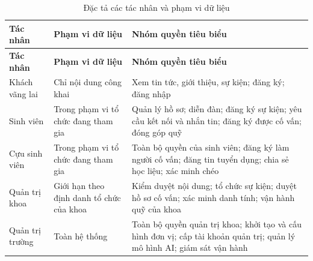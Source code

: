 \documentclass[12pt,a4paper,oneside]{report}
\begin{document}
\renewcommand{\arraystretch}{1.2}
\begin{longtable}{|>{\raggedright\arraybackslash}p{3.0cm}|>{\raggedright\arraybackslash}p{5.2cm}|>{\raggedright\arraybackslash}p{6.3cm}|}
\caption{Đặc tả các tác nhân và phạm vi dữ liệu}\label{tab:actors}\\
\hline \textbf{Tác nhân} & \textbf{Phạm vi dữ liệu} & \textbf{Nhóm quyền tiêu biểu} \\ \hline
\endfirsthead
\hline \textbf{Tác nhân} & \textbf{Phạm vi dữ liệu} & \textbf{Nhóm quyền tiêu biểu} \\ \hline
\endhead
Khách vãng lai & Chỉ nội dung công khai & Xem tin tức, giới thiệu, sự kiện; đăng ký; đăng nhập \\ \hline
Sinh viên & Trong phạm vi tổ chức đang tham gia & Quản lý hồ sơ; diễn đàn; đăng ký sự kiện; yêu cầu kết nối và nhắn tin; đăng ký được cố vấn; đóng góp quỹ \\ \hline
Cựu sinh viên & Trong phạm vi tổ chức đang tham gia & Toàn bộ quyền của sinh viên; đăng ký làm người cố vấn; đăng tin tuyển dụng; chia sẻ học liệu; xác minh chéo \\ \hline
Quản trị khoa & Giới hạn theo định danh tổ chức của khoa & Kiểm duyệt nội dung; tổ chức sự kiện; duyệt hồ sơ cố vấn; xác minh danh tính; vận hành quỹ của khoa \\ \hline
Quản trị trường & Toàn hệ thống & Toàn bộ quyền quản trị khoa; khởi tạo và cấu hình đơn vị; cấp tài khoản quản trị; quản lý mô hình AI; giám sát vận hành \\ \hline
\end{longtable}
\renewcommand{\arraystretch}{1}
\end{document}
